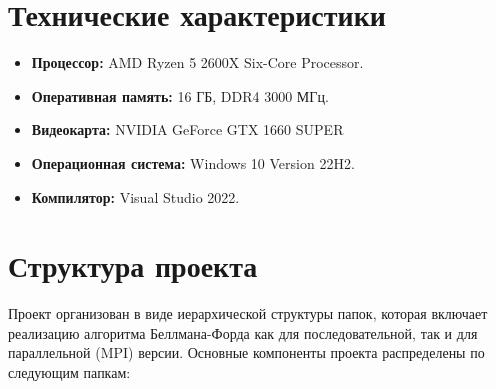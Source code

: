 \documentclass[12pt]{article}
\begin{document}
\section*{Технические характеристики}

\begin{itemize}
    \item \textbf{Процессор:} AMD Ryzen 5 2600X Six-Core Processor.
    \item \textbf{Оперативная память:} 16 ГБ, DDR4 3000 МГц.
    \item \textbf{Видеокарта:} NVIDIA GeForce GTX 1660 SUPER
    \item \textbf{Операционная система:} Windows 10 Version 22H2.
    \item \textbf{Компилятор:} Visual Studio 2022.
\end{itemize}

\section*{Структура проекта}

Проект организован в виде иерархической структуры папок, которая включает реализацию алгоритма Беллмана-Форда как для последовательной, так и для параллельной (MPI) версии. Основные компоненты проекта распределены по следующим папкам:
\end{document}
